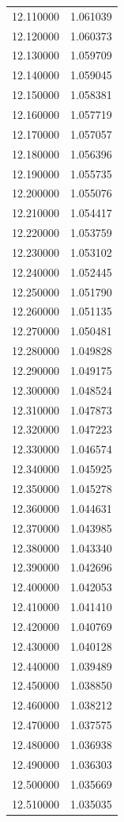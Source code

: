 \begin{tabular}{rr}
12.110000 & 1.061039 \\
12.120000 & 1.060373 \\
12.130000 & 1.059709 \\
12.140000 & 1.059045 \\
12.150000 & 1.058381 \\
12.160000 & 1.057719 \\
12.170000 & 1.057057 \\
12.180000 & 1.056396 \\
12.190000 & 1.055735 \\
12.200000 & 1.055076 \\
12.210000 & 1.054417 \\
12.220000 & 1.053759 \\
12.230000 & 1.053102 \\
12.240000 & 1.052445 \\
12.250000 & 1.051790 \\
12.260000 & 1.051135 \\
12.270000 & 1.050481 \\
12.280000 & 1.049828 \\
12.290000 & 1.049175 \\
12.300000 & 1.048524 \\
12.310000 & 1.047873 \\
12.320000 & 1.047223 \\
12.330000 & 1.046574 \\
12.340000 & 1.045925 \\
12.350000 & 1.045278 \\
12.360000 & 1.044631 \\
12.370000 & 1.043985 \\
12.380000 & 1.043340 \\
12.390000 & 1.042696 \\
12.400000 & 1.042053 \\
12.410000 & 1.041410 \\
12.420000 & 1.040769 \\
12.430000 & 1.040128 \\
12.440000 & 1.039489 \\
12.450000 & 1.038850 \\
12.460000 & 1.038212 \\
12.470000 & 1.037575 \\
12.480000 & 1.036938 \\
12.490000 & 1.036303 \\
12.500000 & 1.035669 \\
12.510000 & 1.035035 \\

\end{tabular}
